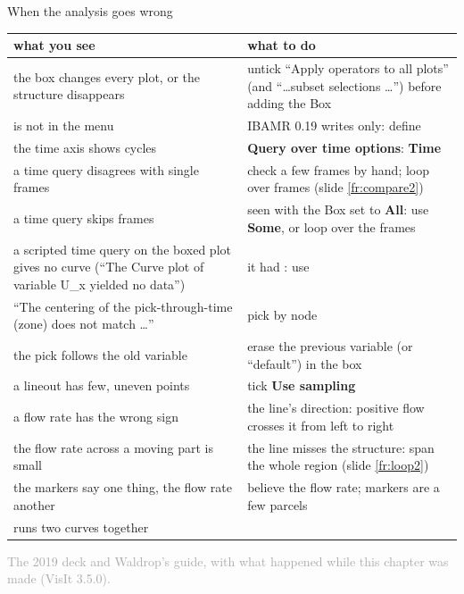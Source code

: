 \documentclass[aspectratio=169,11pt]{beamer}
\newcommand{\sourcecredit}[1]{\vfill\begin{flushright}\tiny\textcolor{DarkGray}{#1}\end{flushright}}
\newcommand{\gui}[1]{\textsf{\textbf{#1}}}
\begin{document}
\begin{frame}{When the analysis goes wrong}
\label{fr:trouble}
\scriptsize
\begin{tabular}{@{}L{0.42\textwidth}L{0.53\textwidth}@{}}
\toprule
what you see & what to do \\
\midrule
the box changes every plot, or the structure disappears & untick ``Apply operators to all plots'' (and ``\dots subset selections \dots'') before adding the Box \\
 is not in the menu & IBAMR 0.19 writes  only: define  \\
the time axis shows cycles & \gui{Query over time options}: \gui{Time} \\
a time query disagrees with single frames & check a few frames by hand; loop over frames (slide \ref{fr:compare2}) \\
a time query skips frames & seen with the Box set to \gui{All}: use \gui{Some}, or loop over the frames \\
a scripted time query on the boxed plot gives no curve (``The Curve plot of variable U\_x yielded no data'') & it had : use  \\
``The centering of the pick-through-time (zone) does not match \dots'' & pick by node \\
the pick follows the old variable & erase the previous variable (or ``default'') in the box \\
a lineout has few, uneven points & tick \gui{Use sampling} \\
a flow rate has the wrong sign & the line's direction: positive flow crosses it from left to right \\
the flow rate across a moving part is small & the line misses the structure: span the whole region (slide \ref{fr:loop2}) \\
the markers say one thing, the flow rate another & believe the flow rate; markers are a few parcels \\
 runs two curves together &  \\
\bottomrule
\end{tabular}
\sourcecredit{The 2019 deck and Waldrop's guide, with what happened while this chapter was made (VisIt 3.5.0).}
\end{frame}
\end{document}
